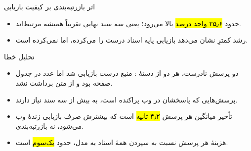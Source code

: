 \begin{frame}{اثر بازرتبه‌بندی بر کیفیت بازیابی}
  \begin{itemize}
    \item {} حدود \hl{۲۵٫۶ واحد درصد} بالا می‌رود؛ یعنی سه سند
          نهایی تقریباً همیشه مرتبط‌اند.
    \item رشد کمترِ  نشان می‌دهد بازیابی پایه اسناد درست را
           می‌کرده، اما  نمی‌کرده است.
  \end{itemize}
\end{frame}

\begin{frame}{تحلیل خطا}
  \begin{PTcons}
    \begin{itemize}
      \item دو پرسش نادرست، هر دو از دستهٔ : منبع درست بازیابی شد اما
            عدد در جدول صفحه بود و از متن برداشت نشد.
      \item پرسش‌هایی که پاسخشان در وب پراکنده است، به بیش از سه سند نیاز دارند.
    \end{itemize}
  \end{PTcons}

  \begin{itemize}
    \item تأخیر میانگین هر پرسش \hl{۴٫۲ ثانیه} است که بیشترش صرف بازیابی زندهٔ
          وب می‌شود، نه بازرتبه‌بندی.
    \item هزینهٔ هر پرسش نسبت به سپردن همهٔ اسناد به مدل، حدود \hl{یک‌سوم} است.
  \end{itemize}
\end{frame}
